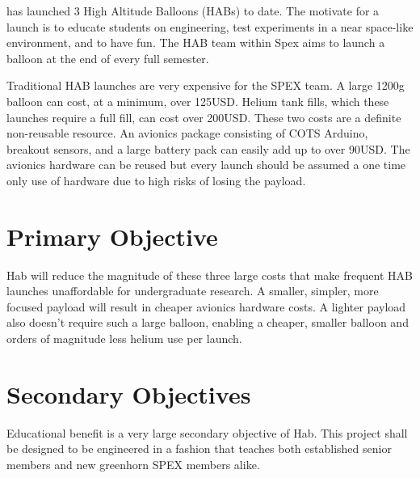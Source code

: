 \documentclass[conference]{IEEEtran} %
\begin{document}
 has launched 3 High Altitude Balloons (HABs) to date.  The
motivate for a launch is to educate students on engineering, test experiments in
a near space-like environment, and to have fun. The HAB team within Spex aims to
launch a balloon at the end of every full semester.

Traditional HAB launches are very expensive for the SPEX team.
A large 1200g balloon can cost, at a minimum, over 125USD.  Helium tank fills,
which these launches require a full fill, can cost over 200USD. These two costs
are a definite non-reusable resource. An avionics package consisting of COTS
Arduino, breakout sensors, and a large battery pack can easily add up to over
90USD. The avionics hardware can be reused but every launch should be assumed a
one time only use of hardware due to high risks of losing the payload.


\section{Primary Objective}
\label{sec:primary-obj}
\textmu{}Hab will reduce the magnitude of these three large costs that make frequent HAB
launches unaffordable for undergraduate research. A smaller, simpler, more
focused payload will result in cheaper avionics hardware costs. A lighter
payload also doesn't require such a large balloon, enabling a cheaper, smaller
balloon and orders of magnitude less helium use per launch.

\section{Secondary Objectives}
\label{sec:secondary-obj}
Educational benefit is a very large secondary objective of \textmu{}Hab.  This
project shall be designed to be engineered in a fashion that teaches both
established senior members and new greenhorn SPEX members alike.
\end{document}
